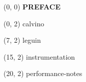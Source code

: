 \documentclass[10pt]{article}
\begin{document}
\begin{textblock}{31}(0, 0)
    \center\huge\textbf{PREFACE}
\end{textblock}

\begin{textblock}{6}(0, 2)
    {calvino}
\end{textblock}

\begin{textblock}{7}(7, 2)
    {leguin}
\end{textblock}

\begin{textblock}{4}(15, 2)
    {instrumentation}
\end{textblock}

\begin{textblock}{11}(20, 2)
    {performance-notes}
\end{textblock}
\end{document}
